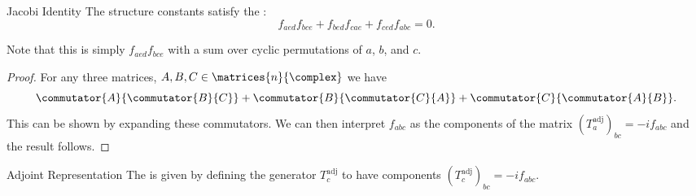 \documentclass[fleqn]{NotesClass}
\begin{document}
    \begin{thm}{Jacobi Identity}{}
        The structure constants satisfy the :
        \begin{equation}
            f_{aed}f_{bce} + f_{bed}f_{cae} + f_{ced}f_{abc} = 0.
        \end{equation}
        \begin{rmk}
            Note that this is simply \(f_{aed}f_{bce}\) with a sum over cyclic permutations of \(a\), \(b\), and \(c\).
        \end{rmk}
        \begin{proof}
            For any three matrices, \(A, B, C \in \matrices{n}{\complex}\) we have
            \begin{equation}
                \commutator{A}{\commutator{B}{C}} + \commutator{B}{\commutator{C}{A}} + \commutator{C}{\commutator{A}{B}}.
            \end{equation}
            This can be shown by expanding these commutators.
            We can then interpret \(f_{abc}\) as the components of the matrix \((T_a^{\mathrm{adj}})_{bc} = -if_{abc}\) and the result follows.
        \end{proof}
    \end{thm}
    
    \begin{dfn}{Adjoint Representation}{}
        The  is given by defining the generator \(T_c^{\mathrm{adj}}\) to have components \((T_c^{\mathrm{adj}})_{bc} = -if_{abc}\).
    \end{dfn}
    
\end{document}
